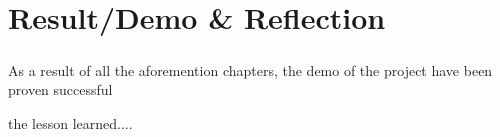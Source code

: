 \chapter{Result/Demo \& Reflection}


\paragraph*{}
As a result of all the aforemention chapters, the demo of the project have been proven successful

the lesson learned....